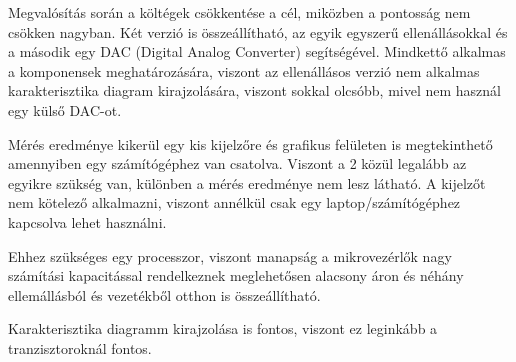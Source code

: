 Megvalósítás során a költégek csökkentése a cél, miközben a pontosság nem csökken nagyban. 
Két verzió is összeállítható, az egyik egyszerű ellenállásokkal és a második egy DAC (Digital 
Analog Converter) segítségével. Mindkettő alkalmas a komponensek meghatározására, viszont az 
ellenállásos verzió nem alkalmas karakterisztika diagram kirajzolására, viszont sokkal olcsóbb, 
mivel nem használ egy külső DAC-ot.

Mérés eredménye kikerül egy kis kijelzőre és grafikus felületen is megtekinthető amennyiben 
egy számítógéphez van csatolva. Viszont a 2 közül legalább az egyikre szükség van, különben a 
mérés eredménye nem lesz látható. A kijelzőt nem kötelező alkalmazni, viszont annélkül csak 
egy laptop/számítógéphez kapcsolva lehet használni.

Ehhez szükséges egy processzor, viszont manapság a mikrovezérlők nagy számítási kapacitással 
rendelkeznek meglehetősen alacsony áron és néhány ellemállásból és vezetékből otthon is 
összeállítható.

Karakterisztika diagramm kirajzolása is fontos, viszont ez leginkább a tranzisztoroknál 
fontos.
